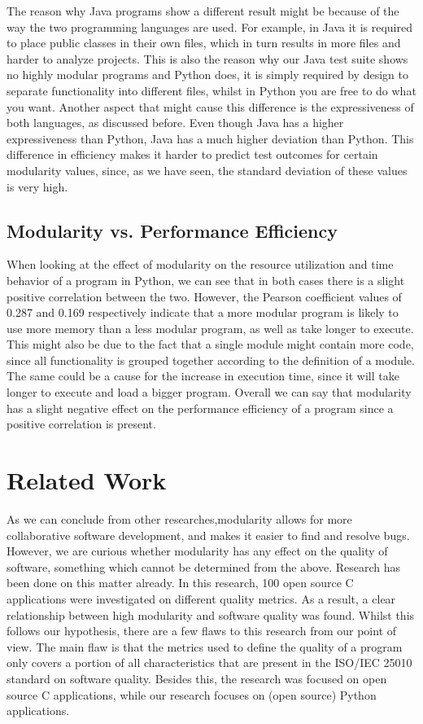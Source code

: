 \documentclass[twoside]{uva-inf-bachelor-thesis}
\begin{document}
The reason why Java programs show a different result might be because of the way the two programming languages are used. For example, in Java it is required to place public classes in their own files, which in turn results in more files and harder to analyze projects. This is also the reason why our Java test suite shows no highly modular programs and Python does, it is simply required by design to separate functionality into different files, whilst in Python you are free to do what you want. Another aspect that might cause this  difference is the expressiveness of both languages, as discussed before. Even though Java has a higher expressiveness than Python\cite{Expressiveness}, Java has a much higher deviation than Python. This difference in efficiency makes it harder to predict test outcomes for certain modularity values, since, as we have seen, the standard deviation of these values is very high.

\section{Modularity vs. Performance Efficiency}
When looking at the effect of modularity on the resource utilization and time behavior of a program in Python, we can see that in both cases there is a slight positive correlation between the two. However, the Pearson coefficient values of 0.287 and 0.169 respectively indicate that a more modular program is likely to use more memory than a less modular program, as well as take longer to execute. This might also be due to the fact that a single module might contain more code, since all functionality is grouped together according to the definition of a module. The same could be a cause for the increase in execution time, since it will take longer to execute and load a bigger program. Overall we can say that modularity has a slight negative effect on the performance efficiency of a program since a positive correlation is present. 

\chapter{Related Work}
As we can conclude from other researches\cite{LinuxKernel,lee2000linux},modularity allows for more collaborative software development, and makes it easier to find and resolve bugs. However, we are curious whether modularity has any effect on the quality of software, something which cannot be determined from the above. Research has been done on this matter already\cite{stamelos2002code}. In this research, 100 open source C applications were investigated on different quality metrics. As a result, a clear relationship between high modularity and software quality was found. Whilst this follows our hypothesis, there are a few flaws to this research from our point of view. The main flaw is that the metrics used to define the quality of a program only covers a portion of all characteristics that are present in the ISO/IEC 25010 standard on software quality\cite{ISO25010}. Besides this, the research was focused on open source C applications, while our research focuses on (open source) Python applications.
\end{document}
